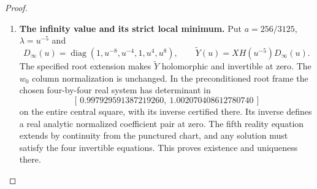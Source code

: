 \documentclass[11pt,a4paper]{article}
\theoremstyle{definition}
\begin{document}
\begin{proof}
\begin{enumerate}[label=\arabic*.]
\paragraph{The real implicit system and Hessian.}
Use the specified fixed four rows on the central square and
write the actual system as $Mv=b$, with
\[
 M_{i,*}=(\operatorname{Im}Y_{i1},\operatorname{Re}Y_{i1},
          \operatorname{Im}Y_{i2},\operatorname{Re}Y_{i2}),
 \qquad b_i=\operatorname{Re}Y_{i3}.
\]
For the top row define $c$ by the same four coordinate projections,
$d=\operatorname{Re}Y_{03}$ and $h=c_0(cv-d)$,
$c_0=96/(625\pi)$. The certified determinant enclosure excludes
zero on the entire central square and on its sixteen subsquares;
the matrix inverse is therefore the actual one there.
For $a,b\in\{x,y\}$, direct differentiation gives
\[
 \begin{split}
 v_a&=M^{-1}(b_a-M_av),\\
 v_{ab}&=M^{-1}(b_{ab}-M_{ab}v-M_av_b-M_bv_a),\\
 h_a&=c_0(c_av+cv_a-d_a),\\
 h_{ab}&=c_0(c_{ab}v+c_av_b+c_bv_a+cv_{ab}-d_{ab}).
 \end{split}
\]
The repeated-index cases retain both cross terms. The actual
complex derivatives supplying these real projections are
\[
 Y_x=YG,\quad Y_y=iYG,\quad
 Y_{xx}=Y(G^2+G'),\quad Y_{xy}=iY(G^2+G'),\quad
 Y_{yy}=-Y(G^2+G').
\]
Taking the stated real and imaginary parts and carrying out these
products with rigorous full-square balls consequently encloses
all Hessian entries throughout the domain. Approximate row
selection merely chooses a minor; it supplies neither its inverse
nor its error bound.

\item \textbf{The infinity value and its strict local minimum.}
Put $a=256/3125$, $\lambda=u^{-5}$ and
\[
 D_\infty(u)=\operatorname{diag}(1,u^{-8},u^{-4},1,u^4,u^8),
 \qquad \widetilde Y(u)=XH(u^{-5})D_\infty(u).
\]
The specified root extension makes $\widetilde Y$ holomorphic
and invertible at zero. The $w_0$ column normalization is unchanged.
In the preconditioned root frame the chosen four-by-four real
system has determinant in
\[
 [\,0.997929591387219260,\ 1.002070408612780740\,]
\]
on the entire central square, with its inverse certified there.
Its inverse defines a real analytic normalized coefficient pair
at zero. The fifth reality equation extends by continuity from
the punctured chart, and any solution must satisfy the four
invertible equations. This proves existence and uniqueness there.


\end{enumerate}
\end{proof}
\end{document}
